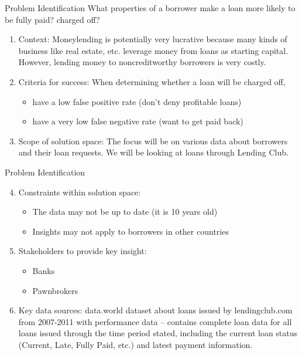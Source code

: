 \documentclass{beamer}
\begin{document}
\begin{frame}{Problem Identification}
What properties of a borrower make a loan more likely to be fully paid? charged
off?
\begin{enumerate}
\item Context: 
Moneylending is potentially very lucrative because many kinds of
business like real estate, etc. leverage money from loans as starting capital.
However, lending money to noncreditworthy borrowers is very costly.
\item Criteria for success: When determining whether a loan will be charged off,
\begin{itemize}
\item have a low false positive rate (don't deny profitable loans)
\item have a very low false negative rate (want to get paid back)
\end{itemize}
\item Scope of solution space: The focus will be on various data 
about borrowers and their loan requests. We will be looking at
loans through Lending Club.
\end{enumerate}
\end{frame}

\begin{frame}{Problem Identification}
\begin{enumerate}
\setcounter{enumi}{3}
\item Constraints within solution space:
\begin{itemize}
\item The data may not be up to date (it is 10 years old)
\item Insights may not apply to borrowers in other countries
\end{itemize}
\item Stakeholders to provide key insight:
\begin{itemize}
\item Banks
\item Pawnbrokers
\end{itemize}
\item Key data sources:
data.world dataset about loans issued by lendingclub.com from 2007-2011
with performance data -- contains complete loan data for all loans issued
through the time period stated, including the current loan status (Current,
Late, Fully Paid, etc.) and latest payment information.
\end{enumerate}
\end{frame}
\end{document}
